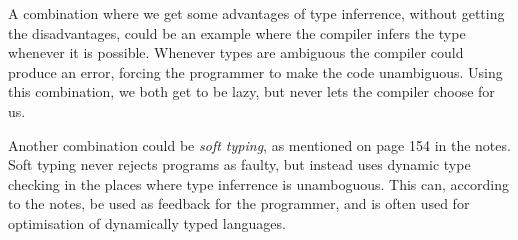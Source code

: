 A combination where we get some advantages of type inferrence, without getting the disadvantages, could be an example where the compiler infers the type whenever it is possible. Whenever types are ambiguous the compiler could produce an error, forcing the programmer to make the code unambiguous. Using this combination, we both get to be lazy, but never lets the compiler choose for us.\par
Another combination could be \textit{soft typing}, as mentioned on page 154 in the notes. Soft typing never rejects programs as faulty, but instead uses dynamic type checking in the places where type inferrence is unamboguous. This can, according to the notes, be used as feedback for the programmer, and is often used for optimisation of dynamically typed languages.
